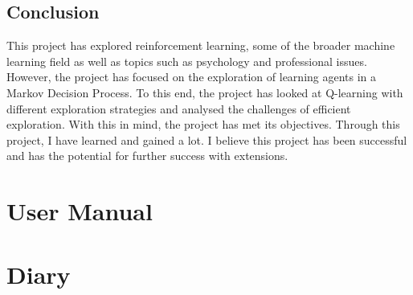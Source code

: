 \documentclass[]{final_report}
\begin{document}
\section{Conclusion}

This project has explored reinforcement learning, some of the broader machine learning field as well as topics such as psychology and professional issues. However, the project has focused on the exploration of learning agents in a Markov Decision Process. To this end, the project has looked at Q-learning with different exploration strategies and analysed the challenges of efficient exploration. With this in mind, the project has met its objectives. Through this project, I have learned and gained a lot. I believe this project has been successful and has the potential for further success with extensions. 

\newpage




\appendix


\chapter{User Manual}

% 

\chapter{Diary}

% 



\label{endpage}
\end{document}
